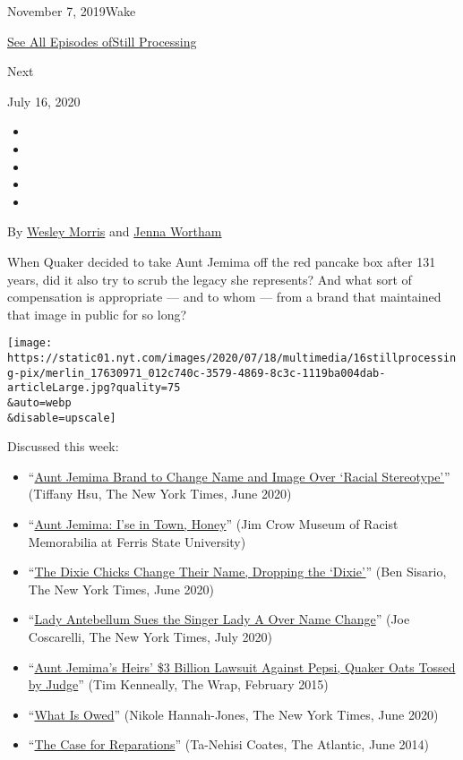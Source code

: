 November 7, 2019Wake

\href{https://www.nytimes.com/column/still-processing-podcast}{See All
Episodes ofStill Processing}

Next

July 16, 2020

\begin{itemize}
\item
\item
\item
\item
\item
\end{itemize}

By \href{https://www.nytimes.com/by/wesley-morris}{Wesley Morris} and
\href{https://www.nytimes.com/by/jenna-wortham}{Jenna Wortham}

When Quaker decided to take Aunt Jemima off the red pancake box after
131 years, did it also try to scrub the legacy she represents? And what
sort of compensation is appropriate --- and to whom --- from a brand
that maintained that image in public for so long?

\texttt{[image: https://static01.nyt.com/images/2020/07/18/multimedia/16stillprocessing-pix/merlin\_17630971\_012c740c-3579-4869-8c3c-1119ba004dab-articleLarge.jpg?quality=75\\\&auto=webp\\\&disable=upscale]}

Discussed this week:

\begin{itemize}
\item
  ``\href{https://www.nytimes.com/2020/06/17/business/media/aunt-jemima-racial-stereotype.html}{Aunt
  Jemima Brand to Change Name and Image Over `Racial Stereotype'}''
  (Tiffany Hsu, The New York Times, June 2020)
\item
  ``\href{https://youtu.be/3ipamH6EEwI}{Aunt Jemima: I'se in Town,
  Honey}'' (Jim Crow Museum of Racist Memorabilia at Ferris State
  University)
\item
  ``\href{https://www.nytimes.com/2020/06/25/arts/music/dixie-chicks-change-name.html}{The
  Dixie Chicks Change Their Name, Dropping the `Dixie'}'' (Ben Sisario,
  The New York Times, June 2020)
\item
  ``\href{https://www.nytimes.com/2020/07/08/arts/music/lady-antebellum-lady-a-lawsuit.html}{Lady
  Antebellum Sues the Singer Lady A Over Name Change}'' (Joe Coscarelli,
  The New York Times, July 2020)
\item
  ``\href{https://www.thewrap.com/aunt-jemima-3-billion-lawsuit-against-pepsi-quaker-oats-tossed-by-judge/}{Aunt
  Jemima's Heirs' \$3 Billion Lawsuit Against Pepsi, Quaker Oats Tossed
  by Judge}'' (Tim Kenneally, The Wrap, February 2015)
\item
  ``\href{https://www.nytimes.com/interactive/2020/06/24/magazine/reparations-slavery.html}{What
  Is Owed}'' (Nikole Hannah-Jones, The New York Times, June 2020)
\item
  ``\href{https://www.theatlantic.com/magazine/archive/2014/06/the-case-for-reparations/361631/?gclid=EAIaIQobChMIprGKz6bQ6gIVStbACh14Vgv2EAAYASAAEgJ6gPD_BwE}{The
  Case for Reparations}'' (Ta-Nehisi Coates, The Atlantic, June 2014)
\end{itemize}


